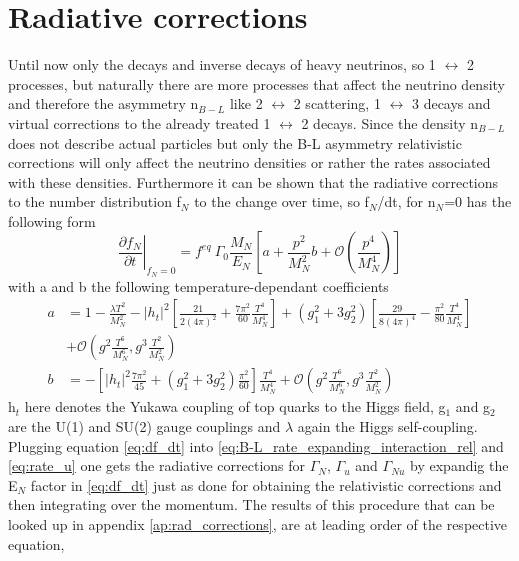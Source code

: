\section{Radiative corrections}
Until now only the decays and inverse decays of heavy neutrinos, so 1 $\leftrightarrow$ 2 processes, but naturally there are more processes that affect the neutrino density and therefore the asymmetry n$_{B-L}$ like 2 $\leftrightarrow$ 2 scattering, 1 $\leftrightarrow$ 3 decays and virtual corrections to the already treated 1 $\leftrightarrow$ 2 decays. \newline
Since the density n$_{B-L}$ does not describe actual particles but only the B-L asymmetry relativistic corrections will only affect the neutrino densities or rather the rates associated with these densities. Furthermore it can be shown that the radiative corrections to the number distribution f$_N$ to the change over time, so f$_N$/dt, for n$_N$=0 has the following form \cite{Laine:2011pq}
\begin{equation}
\left.\frac{\partial f_N}{\partial t}\right|_{f_N=0}=f^{eq}\:\Gamma_0\frac{M_N}{E_N}\left[a+\frac{p^2}{M_N^2}b+\mathcal{O}\left(\frac{p^4}{M_N^4}\right)\right]
\label{eq:df_dt}
\end{equation}
with a and b the following temperature-dependant coefficients
\begin{align}
a&=1-\frac{\lambda T^2}{M_N^2}-\left|h_t\right|^2\left[\frac{21}{2(4\pi)^2}+\frac{7\pi^2}{60}\frac{T^4}{M_N^4}\right]+\left(g_1^2+3g_2^2\right)\left[\frac{29}{8\left(4\pi\right)^4}-\frac{\pi^2}{80}\frac{T^4}{M_N^4}\right]\\
\nonumber
&+\mathcal{O}\left(g^2\frac{T^6}{M_N^6},g^3\frac{T^2}{M_N^2}\right)\\
b&=-\left[\left|h_t\right|^2\frac{7\pi^2}{45}+\left(g_1^2+3g_2^2\right)\frac{\pi^2}{60}\right]\frac{T^4}{M_N^4}+\mathcal{O}\left(g^2\frac{T^6}{M_N^6},g^3\frac{T^2}{M_N^2}\right)
\end{align}
h$_t$ here denotes the Yukawa coupling of top quarks to the Higgs field, g$_1$ and g$_2$ are the U(1) and SU(2) gauge couplings and $\lambda$ again the Higgs self-coupling. \newline
Plugging equation \eqref{eq:df_dt} into \eqref{eq:B-L_rate_expanding_interaction_rel} and \eqref{eq:rate_u} one gets the radiative corrections for $\Gamma_N$, $\Gamma_u$ and $\Gamma_{Nu}$ by expandig the E$_N$ factor in \eqref{eq:df_dt} just as done for obtaining the relativistic corrections and then integrating over the momentum. The results of this procedure that can be looked up in appendix \ref{ap:rad_corrections}, are at leading order of the respective equation,
